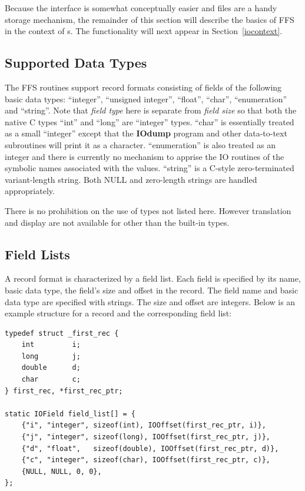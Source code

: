 Because the  interface is somewhat conceptually easier and files are
a handy storage mechanism, the remainder of this section will describe the
basics of FFS in the context of s.  The  functionality
will next appear in Section~\ref{iocontext}.

\subsection{Supported Data Types\label{sec:datatypes}}

The FFS routines support record formats consisting of fields of the following
basic data types: ``integer'', ``unsigned integer'', ``float'', ``char'',
``enumeration'' and ``string''.  Note that {\em field type} here is separate
from {\em field size} so that both the native C types ``int'' and ``long'' are
``integer'' types.  ``char'' is essentially treated as a small ``integer''
except that the {\bf IOdump} program and other data-to-text subroutines will
print it as a character. 
``enumeration'' is also treated as an integer and there is currently no
mechanism to apprise the IO routines of the symbolic names associated with the
values.  ``string'' is a C-style zero-terminated variant-length string.  Both
NULL and zero-length strings are handled appropriately.  

There is no prohibition on the use of types not listed here.  However
translation and display are not available for other than the built-in types.

\subsection{Field Lists\label{sec:fieldlist}}
A record format is characterized by a field list.  Each field is specified by
its name, basic data type, the field's size and offset in the record.  The
field name and basic data type are specified with strings.  The size and
offset are integers.  Below is an example structure for a record and the
corresponding field list:
\begin{verbatim}
typedef struct _first_rec {
    int         i;
    long        j;
    double      d;
    char        c;
} first_rec, *first_rec_ptr;

static IOField field_list[] = {
    {"i", "integer", sizeof(int), IOOffset(first_rec_ptr, i)},
    {"j", "integer", sizeof(long), IOOffset(first_rec_ptr, j)},
    {"d", "float",   sizeof(double), IOOffset(first_rec_ptr, d)},
    {"c", "integer", sizeof(char), IOOffset(first_rec_ptr, c)},
    {NULL, NULL, 0, 0},
};
\end{verbatim}

